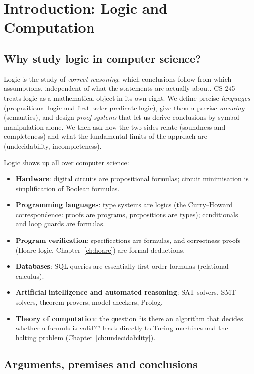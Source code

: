 \chapter{Introduction: Logic and Computation}

\section{Why study logic in computer science?}

Logic is the study of \emph{correct reasoning}: which conclusions follow from which
assumptions, independent of what the statements are actually about. CS 245 treats logic
as a mathematical object in its own right. We define precise \emph{languages}
(propositional logic and first-order predicate logic), give them a precise
\emph{meaning} (semantics), and design \emph{proof systems} that let us derive conclusions
by symbol manipulation alone. We then ask how the two sides relate (soundness and
completeness) and what the fundamental limits of the approach are (undecidability,
incompleteness).

Logic shows up all over computer science:
\begin{itemize}
  \item \textbf{Hardware}: digital circuits are propositional formulas; circuit
        minimisation is simplification of Boolean formulas.
  \item \textbf{Programming languages}: type systems are logics (the Curry--Howard
        correspondence: proofs are programs, propositions are types); conditionals and
        loop guards are formulas.
  \item \textbf{Program verification}: specifications are formulas, and correctness
        proofs (Hoare logic, Chapter~\ref{ch:hoare}) are formal deductions.
  \item \textbf{Databases}: SQL queries are essentially first-order formulas (relational
        calculus).
  \item \textbf{Artificial intelligence and automated reasoning}: SAT solvers, SMT
        solvers, theorem provers, model checkers, Prolog.
  \item \textbf{Theory of computation}: the question ``is there an algorithm that decides
        whether a formula is valid?'' leads directly to Turing machines and the halting
        problem (Chapter~\ref{ch:undecidability}).
\end{itemize}

\section{Arguments, premises and conclusions}

